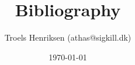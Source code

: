 \documentclass{article}
\author{Troels Henriksen (athas@sigkill.dk)}
\date{\today}
\title{Bibliography}
\begin{document}
\maketitle

\nocite{*}


\end{document}
